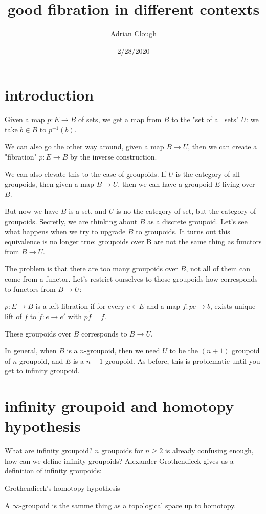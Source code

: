 \documentclass[../main.tex]{subfiles}
\title{good fibration in different contexts}
\author{Adrian Clough}
\date{2/28/2020}
\begin{document}
\maketitle

\tableofcontents

\section{introduction}

Given a map $p: E \rightarrow B$ of sets, we get a map from $B$ to the "set of all sets" $U$: we take $b \in B$ to $p^{-1}(b)$. 

We can also go the other way around, given a map $B \rightarrow U$, then we can create a "fibration" $p: E \rightarrow B$ by the inverse construction. 

We can also elevate this to the case of groupoids. If $U$ is the category of all groupoids, then given a map $B \rightarrow U$, then we can have a groupoid $E$ living over $B$.

But now we have $B$ is a set, and $U$ is no the category of set, but the category of groupoids. Secretly, we are thinking about $B$ as a discrete groupoid. Let's see what happens when we try to upgrade $B$ to groupoids. It turns out this equivalence is no longer true: groupoids over B are not the same thing as functors from $B \rightarrow U$.

The problem is that there are too many groupoids over $B$, not all of them can come from a functor. Let's restrict ourselves to those groupoids how corresponds to functors from $B \rightarrow U$:

\begin{definition}
$p: E \rightarrow B$ is a left fibration if for every $e \in E$ and a map $f: pe \rightarrow b$, exists unique lift of $f$ to $\tilde{f}: e \rightarrow e'$ with $p\tilde{f}=f$.
\end{definition}
These groupoids over $B$ corresponds to $B \rightarrow U$. 

In general, when $B$ is a $n$-groupoid, then we need $U$ to be the $(n+1)$ groupoid of $n$-groupoid, and $E$ is a $n+1$ groupoid. As before, this is problematic until you get to infinity groupoid.


\section{infinity groupoid and homotopy hypothesis}

What are infinity groupoid? $n$ groupoids for $n \geq 2$ is already confusing enough, how can we define infinity groupoids? Alexander Grothendieck gives us a definition of infinity groupoids:

\begin{theorem} {Grothendieck's homotopy hypothesis}

A $\infty$-groupoid is the samme thing as a topological space up to homotopy.

\end{theorem}
\end{document}
